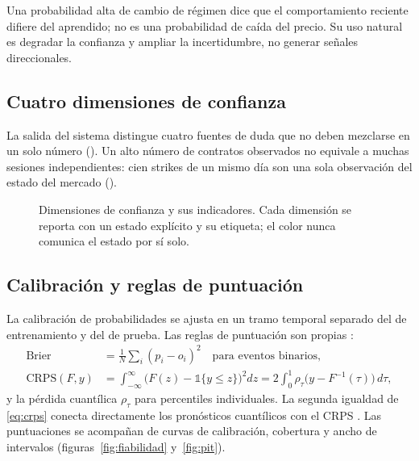 
\begin{noconcluir}
Una probabilidad alta de cambio de régimen dice que el comportamiento reciente difiere del aprendido; no
es una probabilidad de caída del precio. Su uso natural es degradar la confianza y ampliar la
incertidumbre, no generar señales direccionales.
\end{noconcluir}

\subsection{Cuatro dimensiones de confianza}\label{sec:dimensiones}

La salida del sistema distingue cuatro fuentes de duda que no deben mezclarse en un solo número
(). Un alto número de contratos observados no equivale a muchas sesiones
independientes: cien strikes de un mismo día son una sola observación del estado del mercado
().

\begin{figure}[H]
\centering
\resizebox{\linewidth}{!}{}
\caption{Dimensiones de confianza y sus indicadores. Cada dimensión se reporta con un estado explícito y
su etiqueta; el color nunca comunica el estado por sí solo.}
\label{fig:confianza}
\end{figure}

\subsection{Calibración y reglas de puntuación}\label{sec:calibracion}

La calibración de probabilidades se ajusta en un tramo temporal separado del de entrenamiento y del de
prueba. Las reglas de puntuación son propias \citep{gneiting2007}:
\begin{align}
\text{Brier} &= \tfrac1N\textstyle\sum_i (p_i-o_i)^2 \quad\text{para eventos binarios,}\label{eq:brier}\\
\mathrm{CRPS}(F,y) &= \int_{-\infty}^{\infty}\bigl(F(z)-\mathbb 1\{y\le z\}\bigr)^2dz
  = 2\int_0^1\rho_\tau\bigl(y-F^{-1}(\tau)\bigr)\,d\tau ,\label{eq:crps}
\end{align}
y la pérdida cuantílica $\rho_\tau$ para percentiles individuales. La segunda igualdad de \eqref{eq:crps}
conecta directamente los pronósticos cuantílicos con el CRPS \citep{gneiting2011}. Las puntuaciones se
acompañan de curvas de calibración, cobertura y ancho de intervalos (figuras~\ref{fig:fiabilidad}
y~\ref{fig:pit}).

